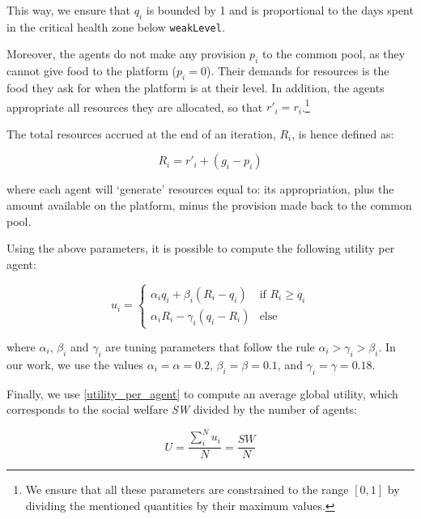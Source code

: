 This way, we ensure that $q_i$ is bounded by 1 and is proportional to the days spent in the critical health zone below \texttt{weakLevel}.

Moreover, the agents do not make any provision $p_i$ to the common pool, as they cannot give food to the platform ($p_i=0$). Their demands for resources is the food they ask for when the platform is at their level. In addition, the agents appropriate all resources they are allocated, so that $r'_i=r_i$.\footnote{We ensure that all these parameters are constrained to the range $[0,1]$ by dividing the mentioned quantities by their maximum values.}

The total resources accrued at the end of an iteration, $R_i$, is hence defined as:

\begin{equation}\label{resources_accrued}
    R_i=r'_i+ (g_i-p_i)
\end{equation}

where each agent will `generate' resources equal to: its appropriation, plus the amount available on the platform, minus the provision made back to the common pool.

Using the above parameters, it is possible to compute the following utility per agent:

\begin{equation}\label{utility_per_agent}
    u_i=\begin{cases}
     \alpha_iq_i + \beta_i(R_i-q_i) & \mbox{if } R_i\geq q_i  \\ 
     \alpha_i R_i - \gamma_i(q_i-R_i) & \mbox{else}
     \end{cases}
\end{equation}


where $\alpha_i$, $\beta_i$ and $\gamma_i$ are tuning parameters that follow the rule $\alpha_i>\gamma_i>\beta_i$. In our work, we use the values $\alpha_i=\alpha=0.2$, $\beta_i=\beta=0.1$, and $\gamma_i=\gamma=0.18$.

Finally, we use \eqref{utility_per_agent} to compute an average global utility, which corresponds to the social welfare \textit{SW} divided by the number of agents:

\begin{equation}\label{utility_eq}
    \mathit{U}=\frac{\sum_i^N u_i}{N}=\frac{\mathit{SW}}{N}
\end{equation}